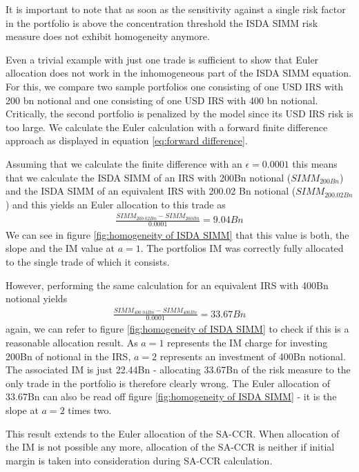 \documentclass[../Thesis_AHoecherl.tex]{subfiles}
\begin{document}
    It is important to note that as soon as the sensitivity against a single risk factor in the portfolio is above the concentration threshold the \gls{ISDA SIMM} risk measure does not exhibit homogeneity anymore.
    
    Even a trivial example with just one trade is sufficient to show that Euler allocation does not work in the inhomogeneous part of the \gls{ISDA SIMM} equation.
    For this, we compare two sample portfolios one consisting of one USD IRS with 200 bn notional and one consisting of one USD IRS with 400 bn notional.
    Critically, the second portfolio is penalized by the model since its USD IRS risk is too large. We calculate the Euler calculation with a forward finite difference approach as displayed in equation \ref{eq:forward difference}.
    
    Assuming that we calculate the finite difference with an $\epsilon = 0.0001$ this means that we calculate the \gls{ISDA SIMM} of an IRS with 200Bn notional ($SIMM_{200Bn}$) and the \gls{ISDA SIMM} of an equivalent IRS with 200.02 Bn notional ($SIMM_{200.02Bn}$) and this yields an Euler allocation to this trade as
    \begin{align*}
        \frac{SIMM_{200.02Bn} - SIMM_{200Bn}}{0.0001} = 9.04Bn
    \end{align*}
    We can see in figure \ref{fig:homogeneity of ISDA SIMM} that this value is both, the slope and the IM value at $a = 1$. The portfolios IM was correctly fully allocated to the single trade of which it consists. 
    
    However, performing the same calculation for an equivalent IRS with 400Bn notional yields
    \begin{align*}
        \frac{SIMM_{400.04Bn} - SIMM_{400Bn}}{0.0001} = 33.67Bn
    \end{align*}
    again, we can refer to figure \ref{fig:homogeneity of ISDA SIMM} to check if this is a reasonable allocation result. As $a=1$ represents the IM charge for investing 200Bn of notional in the \gls{IRS}, $a=2$ represents an investment of 400Bn notional. The associated IM is just 22.44Bn - allocating 33.67Bn of the risk measure to the only trade in the portfolio is therefore clearly wrong. The Euler allocation of 33.67Bn can also be read off figure \ref{fig:homogeneity of ISDA SIMM} - it is the slope at $a=2$ times two.

    This result extends to the Euler allocation of the SA-CCR. When allocation of the IM is not possible any more, allocation of the SA-CCR is neither if initial margin is taken into consideration during SA-CCR calculation.
\end{document}
